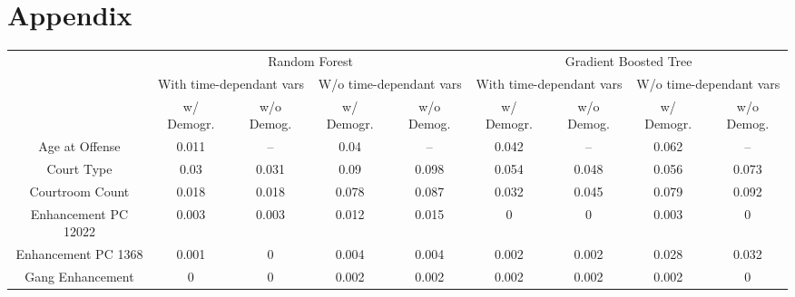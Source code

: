 \documentclass{AISB2008}
\begin{document}
\section{Appendix}
\begin{table}[]
\centering
\tiny
\begin{tabular}{@{}ccccc@{\qquad}cccc@{}}
\cmidrule(r){2-5} \cmidrule(l){7-10}
                          & \multicolumn{4}{c}{Random Forest}                                                            & \multicolumn{4}{c}{Gradient Boosted Tree}                                                  \\ \cmidrule(r){2-5} \cmidrule(l){7-10} 
                          & \multicolumn{2}{c}{With time-dependant vars} & \multicolumn{2}{c}{W/o time-dependant vars}   & \multicolumn{2}{c}{With time-dependant vars} & \multicolumn{2}{c}{W/o time-dependant vars} \\
                          & w/ Demogr.            & w/o Demog.           & w/ Demogr.           & w/o Demog.             & w/ Demogr.            & w/o Demog.           & w/ Demogr.           & w/o Demog.           \\
Age at Offense            & 0.011                 & --                   & 0.04                 & --                     & 0.042                 & --                   & 0.062                & --                   \\
Court Type                & 0.03                  & 0.031                & 0.09                 & 0.098                  & 0.054                 & 0.048                & 0.056                & 0.073                \\
Courtroom Count           & 0.018                 & 0.018                & 0.078                & 0.087                  & 0.032                 & 0.045                & 0.079                & 0.092                \\
Enhancement PC 12022      & 0.003                 & 0.003                & 0.012                & 0.015                  & 0                     & 0                    & 0.003                & 0                    \\
Enhancement PC 1368       & 0.001                 & 0                    & 0.004                & 0.004                  & 0.002                 & 0.002                & 0.028                & 0.032                \\
Gang Enhancement          & 0                     & 0                    & 0.002                & 0.002                  & 0.002                 & 0.002                & 0.002                & 0                    \\

\end{tabular}
\end{table}
\end{document}
